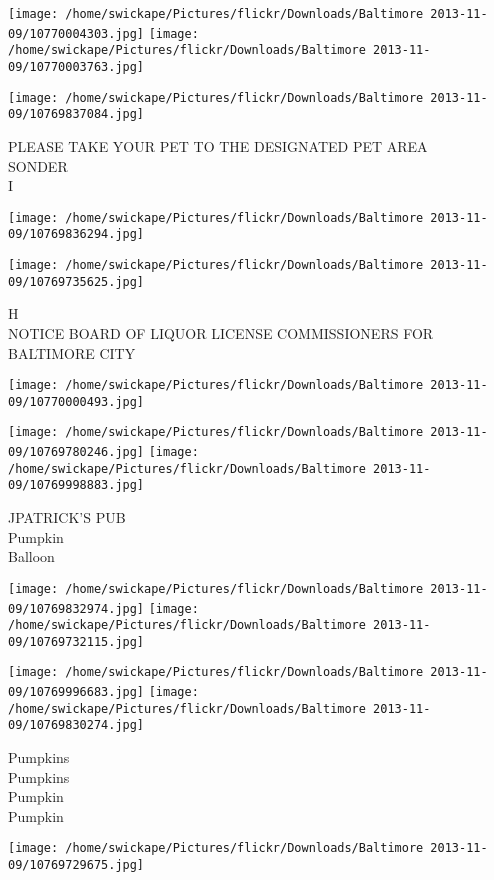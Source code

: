 \documentclass[10pt,letterpaper]{article}
\begin{document}
\texttt{[image: /home/swickape/Pictures/flickr/Downloads/Baltimore 2013-11-09/10770004303.jpg]}
\texttt{[image: /home/swickape/Pictures/flickr/Downloads/Baltimore 2013-11-09/10770003763.jpg]}

\vspace{0.25in}
\texttt{[image: /home/swickape/Pictures/flickr/Downloads/Baltimore 2013-11-09/10769837084.jpg]}

PLEASE TAKE YOUR PET TO THE DESIGNATED PET AREA\\
SONDER\\
I
\pagebreak

\texttt{[image: /home/swickape/Pictures/flickr/Downloads/Baltimore 2013-11-09/10769836294.jpg]}

\vspace{0.25in}
\texttt{[image: /home/swickape/Pictures/flickr/Downloads/Baltimore 2013-11-09/10769735625.jpg]}

H\\
NOTICE BOARD OF LIQUOR LICENSE COMMISSIONERS FOR BALTIMORE CITY
\pagebreak

\texttt{[image: /home/swickape/Pictures/flickr/Downloads/Baltimore 2013-11-09/10770000493.jpg]}

\vspace{0.25in}
\texttt{[image: /home/swickape/Pictures/flickr/Downloads/Baltimore 2013-11-09/10769780246.jpg]}
\texttt{[image: /home/swickape/Pictures/flickr/Downloads/Baltimore 2013-11-09/10769998883.jpg]}

JPATRICK'S PUB\\
Pumpkin\\
Balloon
\pagebreak

\texttt{[image: /home/swickape/Pictures/flickr/Downloads/Baltimore 2013-11-09/10769832974.jpg]}
\texttt{[image: /home/swickape/Pictures/flickr/Downloads/Baltimore 2013-11-09/10769732115.jpg]}

\texttt{[image: /home/swickape/Pictures/flickr/Downloads/Baltimore 2013-11-09/10769996683.jpg]}
\texttt{[image: /home/swickape/Pictures/flickr/Downloads/Baltimore 2013-11-09/10769830274.jpg]}

Pumpkins\\
Pumpkins\\
Pumpkin\\
Pumpkin
\pagebreak

\texttt{[image: /home/swickape/Pictures/flickr/Downloads/Baltimore 2013-11-09/10769729675.jpg]}
\end{document}
